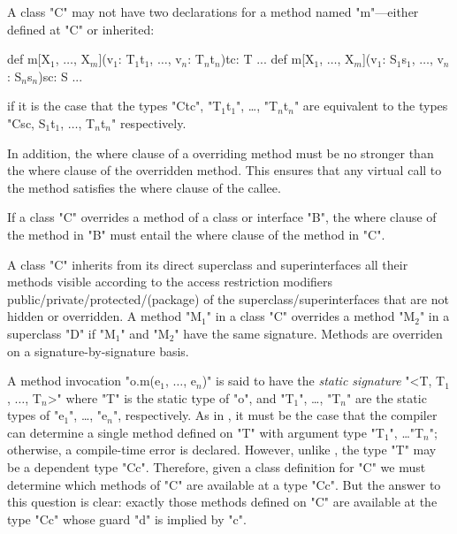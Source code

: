 \begin{staticrule*}
  A class \xcd"C" may not have two declarations for a method named \xcd"m"---either
  defined at \xcd"C" or inherited:
\begin{xtenmath}
def m[X$_1$, $\dots$, X$_m$](v$_1$: T$_1${t$_1$}, $\dots$, v$_n$: T$_n${t$_n$}){tc}: T {...}
def m[X$_1$, $\dots$, X$_m$](v$_1$: S$_1${s$_1$}, $\dots$, v$_n$: S$_n${s$_n$}){sc}: S {...}
\end{xtenmath}
\noindent
if it is the case that the types \xcd"C{tc}", \xcdmath"T$_1${t$_1$}",
\dots, \xcdmath"T$_n${t$_n$}" are
equivalent to the types \xcdmath"C{sc}, S$_1${t$_1$}, $\dots$, T$_n${t$_n$}"
respectively.
\end{staticrule*}

In addition, the where clause of a overriding method must be 
no stronger than the where clause of the overridden method.   This
ensures that any virtual call to the method
satisfies the where clause of the callee.

\begin{staticrule*}
  If a class \xcd"C" overrides a method of a class or interface
  \xcd"B", the where clause of the method in \xcd"B" must entail
  the where clause of the method in \xcd"C".
\end{staticrule*}

A class \xcd"C" inherits from its direct superclass and superinterfaces all
their methods visible according to the access restriction modifiers
public/private/protected/(package) of the superclass/superinterfaces
that are not hidden or overridden. A method \xcdmath"M$_1$" in a class
\xcd"C" overrides
a method \xcdmath"M$_2$" in a superclass \xcd"D" if
\xcdmath"M$_1$" and \xcdmath"M$_2$" have the same signature.
Methods are overriden on a signature-by-signature basis.

A method invocation \xcdmath"o.m(e$_1$, $\dots$, e$_n$)"
is said to have the {\em static signature}
\xcdmath"<T, T$_1$, $\dots$, T$_n$>" where \xcd"T" is the static type of
\xcd"o", and
\xcdmath"T$_1$",
\dots,
\xcdmath"T$_n$"
are the static types of \xcdmath"e$_1$", \dots, \xcdmath"e$_n$",
respectively.  As in
\Java, it must be the case that the compiler can determine a single
method defined on \xcd"T" with argument type
\xcdmath"T$_1$", \dots \xcdmath"T$_n$"; otherwise, a
compile-time error is declared. However, unlike \Java, the \Xten{} type \xcd"T"
may be a dependent type \xcd"C{c}". Therefore, given a class definition for
\xcd"C" we must determine which methods of \xcd"C" are available at a type
\xcd"C{c}". But the answer to this question is clear: exactly those methods
defined on \xcd"C" are available at the type \xcd"C{c}"
whose guard \xcd"d" is implied by \xcd"c".


